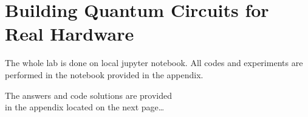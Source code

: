 \documentclass[a4paper, 10pt]{article}
\begin{document}
\subject
{}

\section{Building Quantum Circuits for Real Hardware}

The whole lab is done on local jupyter notebook.
All codes and experiments are performed in the notebook provided in the appendix.

\myspace

\begin{flushright}
	The answers and code solutions are provided \\
	in the appendix located on the next page\dots
\end{flushright}



\end{document}
